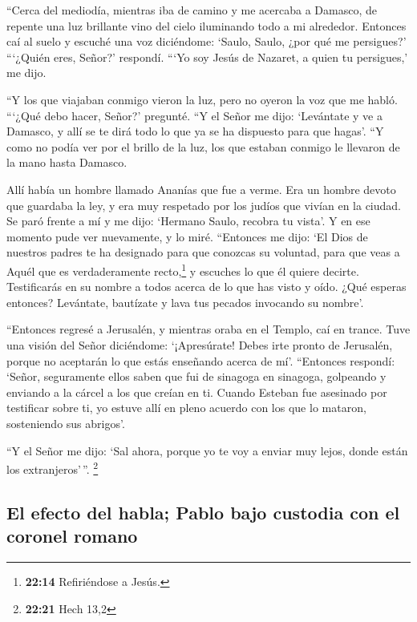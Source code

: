  ``Cerca del mediodía, mientras iba de camino y me
acercaba a Damasco, de repente una luz brillante vino del cielo
iluminando todo a mi alrededor.  Entonces caí al suelo y
escuché una voz diciéndome: `Saulo, Saulo, ¿por qué me persigues?'
 ```¿Quién eres, Señor?' respondí. ```Yo soy Jesús de
Nazaret, a quien tu persigues,' me dijo.

 ``Y los que viajaban conmigo vieron la luz, pero no
oyeron la voz que me habló.  ```¿Qué debo hacer, Señor?'
pregunté. ``Y el Señor me dijo: `Levántate y ve a Damasco, y allí se te
dirá todo lo que ya se ha dispuesto para que hagas'.  ``Y
como no podía ver por el brillo de la luz, los que estaban conmigo le
llevaron de la mano hasta Damasco.

 Allí había un hombre llamado Ananías que fue a verme.
Era un hombre devoto que guardaba la ley, y era muy respetado por los
judíos que vivían en la ciudad.  Se paró frente a mí y me
dijo: `Hermano Saulo, recobra tu vista'. Y en ese momento pude ver
nuevamente, y lo miré.  ``Entonces me dijo: `El Dios de
nuestros padres te ha designado para que conozcas su voluntad, para que
veas a Aquél que es verdaderamente recto,\footnote{\textbf{22:14}
  Refiriéndose a Jesús.} y escuches lo que él quiere decirte.
 Testificarás en su nombre a todos acerca de lo que has
visto y oído. ¿Qué esperas entonces?  Levántate,
bautízate y lava tus pecados invocando su nombre'.

 ``Entonces regresé a Jerusalén, y mientras oraba en el
Templo, caí en trance.  Tuve una visión del Señor
diciéndome: `¡Apresúrate! Debes irte pronto de Jerusalén, porque no
aceptarán lo que estás enseñando acerca de mí'. 
``Entonces respondí: `Señor, seguramente ellos saben que fui de sinagoga
en sinagoga, golpeando y enviando a la cárcel a los que creían en ti.
 Cuando Esteban fue asesinado por testificar sobre ti, yo
estuve allí en pleno acuerdo con los que lo mataron, sosteniendo sus
abrigos'.

 ``Y el Señor me dijo: `Sal ahora, porque yo te voy a
enviar muy lejos, donde están los extranjeros'\,''. \footnote{\textbf{22:21}
  Hech 13,2}

\hypertarget{el-efecto-del-habla-pablo-bajo-custodia-con-el-coronel-romano}{%
\subsection{El efecto del habla; Pablo bajo custodia con el coronel
romano}\label{el-efecto-del-habla-pablo-bajo-custodia-con-el-coronel-romano}}

